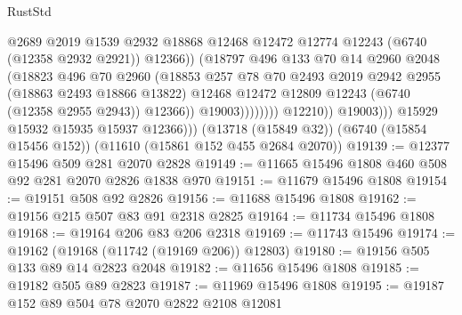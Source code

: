 \begin{lexlean}{RustStd}
\begin{coremodule}
                                      @2689
                                      @2019
                                      @1539
                                      @2932
                                      @18868
                                      @12468
                                      @12472
                                      @12774
                                      @12243
                                      (@6740 (@12358 @2932 @2921))
                                      @12366))
                                  (@18797
                                    @496
                                    @133
                                    @70
                                    @14
                                    @2960
                                    @2048
                                    (@18823
                                      @496
                                      @70
                                      @2960
                                      (@18853
                                        @257
                                        @78
                                        @70
                                        @2493
                                        @2019
                                        @2942
                                        @2955
                                        (@18863 @2493 @18866 @13822)
                                        @12468
                                        @12472
                                        @12809
                                        @12243
                                        (@6740 (@12358 @2955 @2943))
                                        @12366))
                                    @19003))))))))
                    @12210))
                @19003)))
          @15929
          @15932
          @15935
          @15937
          @12366)))
    (@13718 (@15849 @32))
    (@6740 (@15854 @15456 @152))
    (@11610 (@15861 @152 @455 @2684 @2070))
@19139 := @12377 @15496 @509 @281 @2070 @2828
@19149 := @11665 @15496 @1808 @460 @508 @92 @281 @2070 @2826 @1838 @970
@19151 := @11679 @15496 @1808
@19154 := @19151 @508 @92 @2826
@19156 := @11688 @15496 @1808
@19162 := @19156 @215 @507 @83 @91 @2318 @2825
@19164 := @11734 @15496 @1808
@19168 := @19164 @206 @83 @206 @2318
@19169 := @11743 @15496
@19174 := @19162 (@19168 (@11742 (@19169 @206)) @12803)
@19180 := @19156 @505 @133 @89 @14 @2823 @2048
@19182 := @11656 @15496 @1808
@19185 := @19182 @505 @89 @2823
@19187 := @11969 @15496 @1808
@19195 := @19187 @152 @89 @504 @78 @2070 @2822 @2108 @12081

\end{coremodule}
\end{lexlean}
